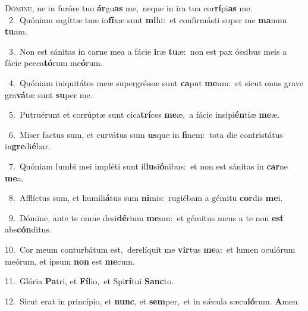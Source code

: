 \lettrine{\initial\textcolor{\initialcolor}{D}}{ómine,} ne in furóre tuo \textbf{ár}\-gu\textbf{as} me,~\star neque in ira tua cor\-\textbf{rí}\-pi\textbf{as} me.\\
{\numbfont\textcolor{\numbcolor}{~2.}}~Quóniam sagíttæ tuæ in\-\textbf{fí}\-xæ sunt \textbf{mi}\-hi:~\star et confirmásti super me \textbf{ma}\-num \textbf{tu}\-am.\par
{\numbfont\textcolor{\numbcolor}{~3.}}~Non est sánitas in carne mea a fácie \textbf{i}\-ræ \textbf{tu}\-æ:~\star non est pax óssibus meis a fácie pecca\-\textbf{tó}\-rum me\-\textbf{ó}\-rum.\par
{\numbfont\textcolor{\numbcolor}{~4.}}~Quóniam iniquitátes meæ supergréssæ sunt \textbf{ca}\-put \textbf{me}\-um:~\star et sicut onus grave gra\-\textbf{vá}\-tæ sunt \textbf{su}\-per me.\par
{\numbfont\textcolor{\numbcolor}{~5.}}~Putruérunt et corrúptæ sunt cica\-\textbf{trí}\-ces \textbf{me}\-æ,~\star a fácie insipi\-\textbf{én}\-tiæ \textbf{me}\-æ.\par
{\numbfont\textcolor{\numbcolor}{~6.}}~Miser factus sum, et curvátus sum \textbf{us}\-que in \textbf{fi}\-nem:~\star tota die contristátus in\-\textbf{gre}\-di\-\textbf{é}\-bar.\par
{\numbfont\textcolor{\numbcolor}{~7.}}~Quóniam lumbi mei impléti sunt il\-\textbf{lu}\-si\-\textbf{ó}\-nibus:~\star et non est sánitas in \textbf{car}\-ne \textbf{me}\-a.\par
{\numbfont\textcolor{\numbcolor}{~8.}}~Afflíctus sum, et humili\-\textbf{á}\-tus sum \textbf{ni}\-mis:~\star rugiébam a gémitu \textbf{cor}\-dis \textbf{me}\-i.\par
{\numbfont\textcolor{\numbcolor}{~9.}}~Dómine, ante te omne desi\-\textbf{dé}\-rium \textbf{me}\-um:~\star et gémitus meus a te non \textbf{est} abs\-\textbf{cón}\-ditus.\par
{\numbfont\textcolor{\numbcolor}{10.}}~Cor meum conturbátum est,~\dagger derelíquit me \textbf{vir}\-tus \textbf{me}\-a:~\star et lumen oculórum meórum, et ipsum \textbf{non} est \textbf{me}\-cum.\par
{\numbfont\textcolor{\numbcolor}{11.}}~Glória \textbf{Pa}\-tri, et \textbf{Fí}\-lio,~\star et Spi\-\textbf{rí}\-tui \textbf{Sanc}\-to.\par
{\numbfont\textcolor{\numbcolor}{12.}}~Sicut erat in princípio, et \textbf{nunc}\-, et \textbf{sem}\-per,~\star et in sǽcula sæcu\-\textbf{ló}\-rum. \textbf{A}\-men.\par
